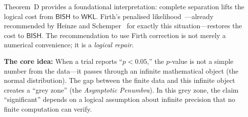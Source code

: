 \documentclass[11pt,a4paper]{article}
\theoremstyle{plain}
\theoremstyle{definition}
\newcommand{\BISH}{\textsf{BISH}}
\newcommand{\WKL}{\textsf{WKL}}
\begin{document}
Theorem~D provides a foundational interpretation: complete separation lifts the logical cost from $\BISH$ to $\WKL$.  Firth's penalised likelihood~\cite{firth1993}---already recommended by Heinze and Schemper~\cite{heinze-schemper} for exactly this situation---restores the cost to $\BISH$.  The recommendation to use Firth correction is not merely a numerical convenience; it is a \emph{logical repair}.

\begin{tcolorbox}[
  colback=blue!5,
  colframe=blue!50!black,
  fonttitle=\bfseries\large,
  title={What This Means for a Clinician},
  arc=4pt,
  boxrule=1pt
]

\textbf{The core idea:} When a trial reports ``$p < 0.05$,'' the $p$-value is not a simple number from the data---it passes through an infinite mathematical object (the normal distribution).  The gap between the finite data and this infinite object creates a ``grey zone'' (the \emph{Asymptotic Penumbra}).  In this grey zone, the claim ``significant'' depends on a logical assumption about infinite precision that no finite computation can verify.

\medskip


\end{tcolorbox}
\end{document}
